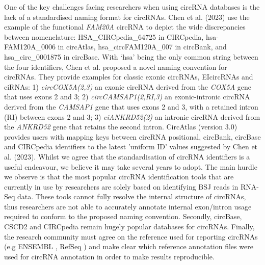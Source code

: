 \documentclass[pdflatex,sn-mathphys-num]{sn-jnl}
\begin{document}
One of the key challenges facing researchers when using circRNA databases is the lack of a standardised naming format for circRNAs. Chen et al. (2023) \cite{Chen2023Jan} use the example of the functional \textit{FAM20A} circRNA to depict the wide discrepancies between nomenclature: HSA\_CIRCpedia\_64725 in CIRCpedia, hsa-FAM120A\_0006 in circAtlas, hsa\_circFAM120A\_007 in circBank, and hsa\_circ\_0001875 in circBase. With `hsa' being the only common string between the four identifiers, Chen et al. proposed a novel naming convention for circRNAs. They provide examples for classic exonic circRNAs, EIcircRNAs and ciRNAs: 1) \textit{circCOX5A(2,3)} an exonic circRNA derived from the \textit{COX5A} gene that uses exons 2 and 3; 2) \textit{circCAMSAP1(2,RI,3)} an exonic-intronic circRNA derived from the \textit{CAMSAP1} gene that uses exons 2 and 3, with a retained intron (RI) between exons 2 and 3; 3) \textit{ciANKRD52(2)} an intronic circRNA derived from the \textit{ANKRD52} gene that retains the second intron. CircAtlas (version 3.0) \cite{circatlas3} provides users with mapping keys between circRNA positional, circBank, circBase and CIRCpedia identifiers to the latest 'uniform ID' values suggested by Chen et al. (2023). Whilst we agree that the standardisation of circRNA identifiers is a useful endeavour, we believe it may take several years to adopt. The main hurdle we observe is that the most popular circRNA identification tools that are currently in use by researchers are solely based on identifying BSJ reads in RNA-Seq data. These tools cannot fully resolve the internal structure of circRNAs, thus researchers are not able to accurately annotate internal exon/intron usage required to conform to the proposed naming convention. Secondly, circBase, CSCD2 and CIRCpedia remain hugely popular databases for circRNAs. Finally, the research community must agree on the reference used for reporting circRNAs (e.g ENSEMBL \cite{ENSEMBL2023}, RefSeq \cite{RefSeq}) and make clear which reference annotation files were used for circRNA annotation in order to make results reproducible.
\end{document}
